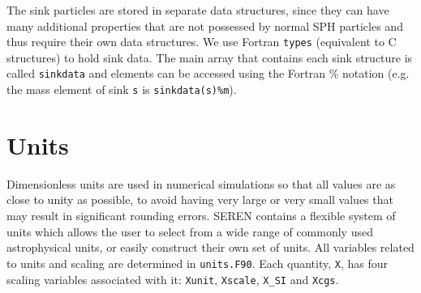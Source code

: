 \documentclass[a4paper]{article}
\newcommand{\NAME}{SEREN }
\newcommand{\var}[1]{\texttt{#1}}
\begin{document}
%
%
%
%
%
%

The sink particles are stored in separate data structures, since they can have many additional properties that are not possessed by normal SPH particles and thus require their own data structures.  We use Fortran \var{types} (equivalent to C structures) to hold sink data.  The main array that contains each sink structure is called \var{sinkdata} and elements can be accessed using the Fortran \% notation (e.g. the mass element of sink \var{s} is \var{sinkdata(s)\%m}).  


\newpage
\section{Units}
Dimensionless units are used in numerical simulations so that all values are as close to unity as possible, to avoid having very large or very small values that may result in significant rounding errors.  \NAME contains a flexible system of units which allows the user to select from a wide range of commonly used astrophysical units, or easily construct their own set of units.  All variables related to units and scaling are determined in \var{units.F90}.  Each quantity, \var{X}, has four scaling variables associated with it: \var{Xunit}, \var{Xscale}, \var{X\_SI} and \var{Xcgs}.
\end{document}
